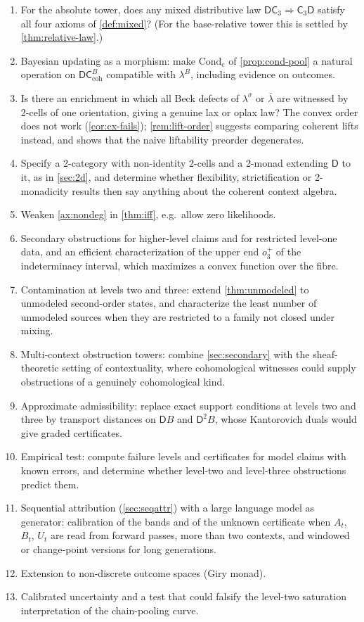\documentclass[11pt]{article}
\theoremstyle{definition}
\theoremstyle{remark}
\newcommand{\D}{\mathsf{D}}
\newcommand{\Cond}{\mathrm{Cond}}
\newcommand{\C}{\mathsf{C}}
\newcommand{\lb}{\bar\lambda}
\newcommand{\ls}{\lambda^{\sigma}}
\begin{document}
\begin{enumerate}[leftmargin=*]
\item For the absolute tower, does any mixed distributive law $\D\C_3\Rightarrow\C_3\D$ satisfy
  all four axioms of \cref{def:mixed}? (For the base-relative tower this is settled by
  \cref{thm:relative-law}.)
\item Bayesian updating as a morphism: make $\Cond_e$ of \cref{prop:cond-pool} a natural operation
  on $\D\C^B_{\mathrm{coh}}$ compatible with $\lambda^B$, including evidence on outcomes.
\item Is there an enrichment in which all Beck defects of $\ls$ or $\lb$ are witnessed by 2-cells of
  one orientation, giving a genuine lax or oplax law? The convex order does not work
  (\cref{cor:cx-fails}); \cref{rem:lift-order} suggests comparing coherent lifts instead, and shows
  that the naive liftability preorder degenerates.
\item Specify a 2-category with non-identity 2-cells and a 2-monad extending $\D$ to it, as in
  \cref{sec:2d}, and determine whether flexibility, strictification or 2-monadicity results then say
  anything about the coherent context algebra.
\item Weaken \cref{ax:nondeg} in \cref{thm:iff}, e.g.\ allow zero likelihoods.
\item Secondary obstructions for higher-level claims and for restricted level-one data, and an
  efficient characterization of the upper end $o_3^+$ of the indeterminacy interval, which maximizes a
  convex function over the fibre.
\item Contamination at levels two and three: extend \cref{thm:unmodeled} to unmodeled second-order
  states, and characterize the least number of unmodeled sources when they are restricted to a
  family not closed under mixing.
\item Multi-context obstruction towers: combine \cref{sec:secondary} with the sheaf-theoretic
  setting of contextuality, where cohomological witnesses \cite{AbramskyMansfieldBarbosa2012} could
  supply obstructions of a genuinely cohomological kind.
\item Approximate admissibility: replace exact support conditions at levels two and three by
  transport distances on $\D B$ and $\D^2B$, whose Kantorovich duals would give graded certificates.
\item Empirical test: compute failure levels and certificates for model claims with known errors, and
  determine whether level-two and level-three obstructions predict them.
\item Sequential attribution (\cref{sec:seqattr}) with a large language model as generator: calibration of the bands and of the unknown certificate when $A_t$, $B_t$, $U_t$ are read from forward passes, more than two contexts, and windowed or change-point versions for long generations.
\item Extension to non-discrete outcome spaces (Giry monad).
\item Calibrated uncertainty and a test that could falsify the level-two saturation interpretation of
  the chain-pooling curve.
\end{enumerate}
\end{document}
